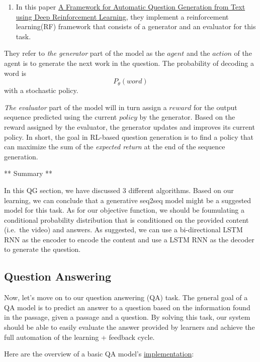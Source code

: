 \documentclass[]{book}
\providecommand{\tightlist}{%
  \setlength{\itemsep}{0pt}\setlength{\parskip}{0pt}}
\theoremstyle{definition}
\theoremstyle{definition}
\theoremstyle{definition}
\theoremstyle{remark}
\begin{document}
\begin{enumerate}
\def\labelenumi{\arabic{enumi}.}
\setcounter{enumi}{2}
\tightlist
\item
  In this paper \href{https://arxiv.org/pdf/1808.04961.pdf}{A Framework
  for Automatic Question Generation from Text using Deep Reinforcement
  Learning}, they implement a reinforcement learning(RF) framework that
  consists of a generator and an evaluator for this task.
\end{enumerate}

They refer to \emph{the generator} part of the model as the \(agent\)
and the \(action\) of the agent is to generate the next work in the
question. The probability of decoding a word is \[P_{\theta}(word)\]
with a stochastic policy.

\emph{The evaluator} part of the model will in turn assign a \(reward\)
for the output sequence predicted using the current \(policy\) by the
generator. Based on the reward assigned by the evaluator, the generator
updates and improves its current policy. In short, the goal in RL-based
question generation is to find a policy that can maximize the sum of the
\emph{expected return} at the end of the sequence generation.

** Summary **

In this QG section, we have discussed 3 different algorithms. Based on
our learning, we can conclude that a generative seq2seq model might be a
suggested model for this task. As for our objective function, we should
be foumulating a conditional probability distribution that is
conditioned on the provided content (i.e.~the video) and answers. As
suggested, we can use a bi-directional LSTM RNN as the encoder to encode
the content and use a LSTM RNN as the decoder to generate the question.

\subsection{Question Answering}\label{question-answering}

Now, let's move on to our question answering (QA) task. The general goal
of a QA model is to predict an answer to a question based on the
information found in the passage, given a passage and a question. By
solving this task, our system should be able to easily evaluate the
answer provided by learners and achieve the full automation of the
learning + feedback cycle.

Here are the overview of a basic QA model's
\href{@qa_imp}{implementation}:
\end{document}
